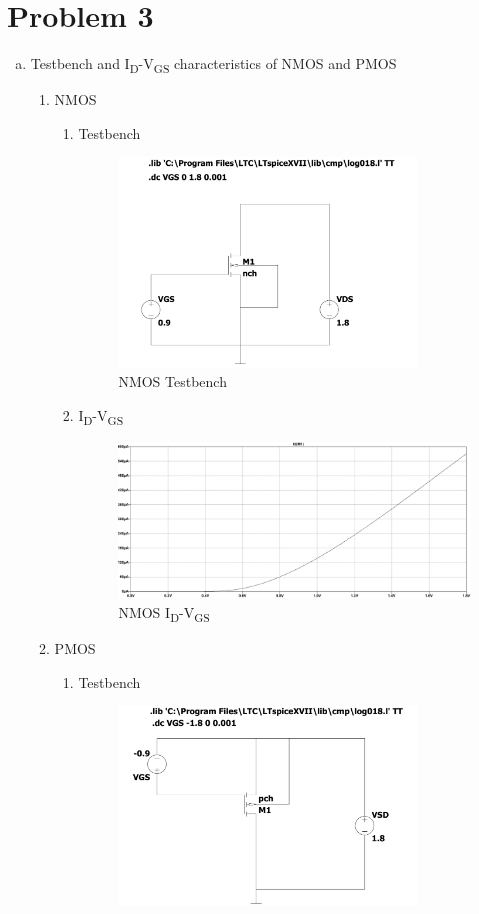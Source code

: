 \documentclass{article}
\begin{document}
\section{Problem 3}
\label{sec:org4b234f6}
\begin{enumerate}[(a)]
\item Testbench and I\textsubscript{D}-V\textsubscript{GS} characteristics of NMOS and PMOS
\begin{enumerate}[1.]
\item NMOS
\begin{enumerate}
\item Testbench
\begin{figure}[H]
\centering
\includegraphics[width=300px]{img/q3/a/nmos-testbench.pdf}
\caption{\label{fig:nmos-testbench}NMOS Testbench}
\end{figure}
\item I\textsubscript{D}-V\textsubscript{GS}
\begin{figure}[H]
\centering
\includegraphics[width=.9\linewidth]{img/q3/a/nmos-id-vgs.pdf}
\caption{\label{fig:nmos-id-vgs}NMOS I\textsubscript{D}-V\textsubscript{GS}}
\end{figure}
\end{enumerate}
\item PMOS
\begin{enumerate}
\item Testbench
\begin{figure}[H]
\centering
\includegraphics[width=300px]{img/q3/a/pmos-testbench.pdf}

\end{figure}
\end{enumerate}
\end{enumerate}
\end{enumerate}
\end{document}
